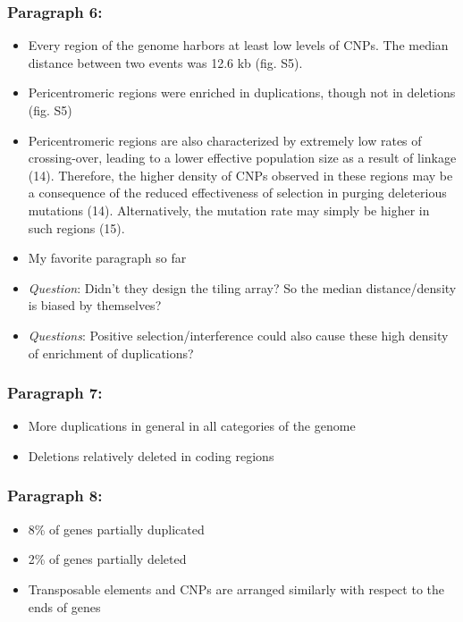 \documentclass[]{book}
\providecommand{\tightlist}{%
  \setlength{\itemsep}{0pt}\setlength{\parskip}{0pt}}
\begin{document}
\hypertarget{paragraph-6}{%
\subsubsection{Paragraph 6:}\label{paragraph-6}}

\begin{itemize}
\tightlist
\item
  Every region of the genome harbors at least low levels of CNPs. The median distance between two events was 12.6 kb (fig. S5).
\item
  Pericentromeric regions were enriched in duplications, though not in deletions (fig. S5)
\item
  Pericentromeric regions are also characterized by extremely low rates of crossing-over, leading to a lower effective population size as a result of linkage (14). Therefore, the higher density of CNPs observed in these regions may be a consequence of the reduced effectiveness of selection in purging deleterious mutations (14). Alternatively, the mutation rate may simply be higher in such regions (15).
\item
  My favorite paragraph so far
\item
  \emph{Question}: Didn't they design the tiling array? So the median distance/density is biased by themselves?
\item
  \emph{Questions}: Positive selection/interference could also cause these high density of enrichment of duplications?
\end{itemize}

\hypertarget{paragraph-7}{%
\subsubsection{Paragraph 7:}\label{paragraph-7}}

\begin{itemize}
\tightlist
\item
  More duplications in general in all categories of the genome
\item
  Deletions relatively deleted in coding regions
\end{itemize}

\hypertarget{paragraph-8}{%
\subsubsection{Paragraph 8:}\label{paragraph-8}}

\begin{itemize}
\tightlist
\item
  8\% of genes partially duplicated
\item
  2\% of genes partially deleted
\item
  Transposable elements and CNPs are arranged similarly with respect to the ends of genes
\end{itemize}
\end{document}
